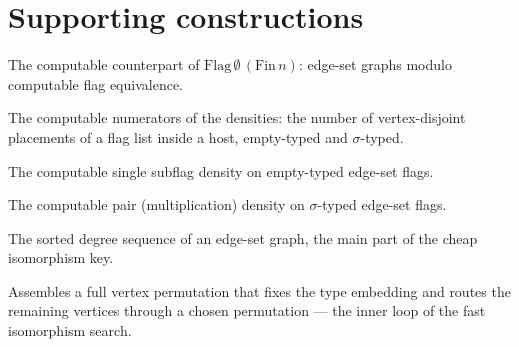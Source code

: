 \section{Supporting constructions}

\begin{definition}
  \label{def:sym2-empty-flag}
  \leanok
  The computable counterpart of $\mathrm{Flag}\,\emptyset\,(\mathrm{Fin}\,n)$:
  edge-set graphs modulo computable flag equivalence.
\end{definition}

\begin{definition}
  \label{def:sym2-count}
  \leanok
  The computable numerators of the densities: the number of vertex-disjoint
  placements of a flag list inside a host, empty-typed and $\sigma$-typed.
\end{definition}

\begin{definition}
  \label{def:sym2-density1}
  \leanok
  The computable single subflag density on empty-typed edge-set flags.
\end{definition}

\begin{definition}
  \label{def:sym2-density2}
  \leanok
  The computable pair (multiplication) density on $\sigma$-typed edge-set flags.
\end{definition}

\begin{definition}
  \label{def:deg-seq}
  \leanok
  The sorted degree sequence of an edge-set graph, the main part of the cheap
  isomorphism key.
\end{definition}

\begin{definition}
  \label{def:build-full-map}
  \leanok
  Assembles a full vertex permutation that fixes the type embedding and routes the
  remaining vertices through a chosen permutation --- the inner loop of the fast
  isomorphism search.
\end{definition}


